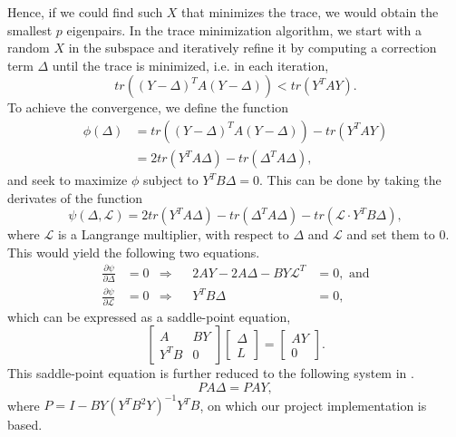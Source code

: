 Hence, if we could find such $X$ that minimizes the trace, we would obtain the smallest $p$ eigenpairs. In the
trace minimization algorithm, we start with a random $X$ in the subspace and iteratively refine it by computing a
correction term $\Delta$ until the trace is minimized, i.e. in each iteration,
\begin{equation}
	tr\left((Y - \Delta)^T A (Y - \Delta)\right) < tr\left(Y^T A Y\right).
\end{equation}
To achieve the convergence, we define the function
\begin{align}
	\phi(\Delta) &= tr\left((Y - \Delta)^T A (Y - \Delta)\right) - tr\left(Y^T A Y\right)\nonumber\\
							 &= 2tr\left(Y^T A\Delta\right) - tr(\Delta^T A\Delta),
\end{align}
and seek to maximize $\phi$ subject to $Y^T B \Delta = 0$. This can be done by taking the derivates of the function
\begin{equation}
	\psi(\Delta, \mathcal{L}) = 2tr\left(Y^T A\Delta\right) - tr(\Delta^T A\Delta) - tr(\mathcal{L}\cdot Y^T B\Delta),
\end{equation}
where $\mathcal{L}$ is a Langrange multiplier, with respect to $\Delta$ and $\mathcal{L}$ and set them to $0$. This
would yield the following two equations.
\begin{align}
	\frac{\partial \psi}{\partial \Delta} &= 0 &\Rightarrow &&2AY - 2A\Delta - BY\mathcal{L}^T &= 0,\text{ and}\\
	\frac{\partial \psi}{\partial \mathcal{L}} &= 0 &\Rightarrow &&Y^T B\Delta &= 0,
\end{align}
which can be expressed as a saddle-point equation,
\begin{equation}
	\begin{bmatrix}
		A & BY\\
		Y^T B & 0
	\end{bmatrix} \begin{bmatrix}
		\Delta \\ L
	\end{bmatrix} = \begin{bmatrix}
		AY \\ 0
	\end{bmatrix}.
\end{equation}
This saddle-point equation is further reduced to the following system in \cite{sameh1982}.
\begin{equation}
	PA\Delta = PAY,
\end{equation}
where $P = I - BY(Y^T B^2 Y)^{-1} Y^T B$, on which our project implementation is based.

